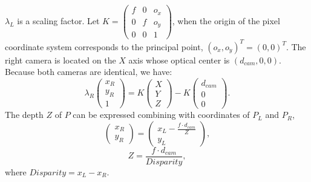 $\lambda_L$ is a scaling factor.
Let $K=\begin{pmatrix}f & 0 & o_x\\0 & f & o_y\\ 0 & 0 & 1\end{pmatrix}$,
when the origin of the pixel coordinate system corresponds to the principal point,
 $(o_x,o_y)^T=(0,0)^T$.
The right camera is located on the $X$ axis whose optical center is $(d_{cam},0,0)$.
Because both cameras are identical, we have:
\begin{equation}
\lambda_R \begin{pmatrix}x_R \\ y_R \\ 1 \end{pmatrix} = K \begin{pmatrix}X \\ Y \\ Z\end{pmatrix} - K  \begin{pmatrix}d_{cam} \\ 0 \\ 0\end{pmatrix}.
\end{equation}
The depth $Z$ of $P$ can be expressed combining with coordinates of $P_L$ and $P_R$,
\begin{equation}
\begin{pmatrix}x_R \\ y_R \end{pmatrix} = \begin{pmatrix} {x_L-\frac{f \cdot d_{cam}}{Z}} \\ y_L \end{pmatrix},
\end{equation}
\begin{equation}
  Z=\frac{f \cdot d_{cam}}{Disparity},
\end{equation}
where $Disparity=x_L-x_R$.
